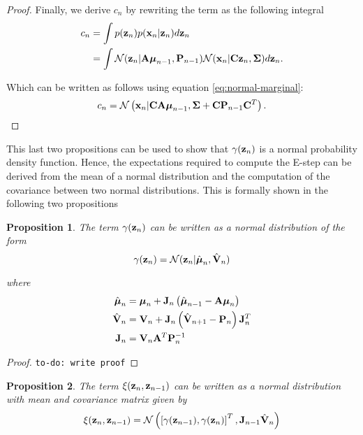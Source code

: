 \documentclass[11pt]{article}
\numberwithin{equation}{section}
\newcommand{\x}{{\bf x}}
\newcommand{\z}{{\bf z}}
\newtheorem{proposition}{Proposition}[section]
\begin{document}
\begin{proof}
	Finally, we derive $c_n$ by rewriting the term as the following integral
	\begin{align}
		c_n &= \int p(\z_n) p (\x_n \vert \z_n) d\z_n\\
			&= \int \mathcal{N}(\z_n\vert {\bf A} \boldsymbol\mu_{n-1}, {\bf P}_{n-1}) \mathcal{N}(\x_n \vert {\bf C}\z_n, \boldsymbol\Sigma) d\z_n.
	\end{align}
	
	Which can be written as follows using equation \ref{eq:normal-marginal}:
	\begin{equation}
		c_n = \mathcal{N}\left(\x_n \vert {\bf C}{\bf A}\boldsymbol\mu_{n-1}, \boldsymbol\Sigma + {\bf C}{\bf P}_{n-1}{\bf C}^T\right).
	\end{equation}	
\end{proof}


This last two propositions can be used to show that $\gamma(\z_n)$ is a normal probability density function. Hence, the expectations required to compute the E-step can be derived from the mean of a normal distribution and the computation of the covariance between two normal distributions. This is formally shown in the following two propositions


\begin{proposition}
	The term $\gamma(\z_n)$ can be written as a normal distribution of the form
	\begin{equation}
		\gamma(\z_n) = \mathcal{N}(\z_n\vert \hat{\boldsymbol\mu}_n, \hat{\bf V}_n)
	\end{equation}
	
	where
	\begin{align}
		\hat{\boldsymbol{\mu}}_n &= \boldsymbol{\mu}_n + {\bf J}_n\left(\hat{\boldsymbol \mu}_{n-1} - {\bf A}\boldsymbol\mu_n\right)\\
		\hat{\bf V}_n &= {\bf V}_n + {\bf J}_n\left(\hat{\bf V}_{n+1} - {\bf P}_n\right){\bf J}_n^T\\
		{\bf J}_n &= {\bf V}_n{\bf A}^T{\bf P}_n^{-1}
	\end{align}
\end{proposition}

\begin{proof}
	\texttt{to-do: write proof}
\end{proof}

\begin{proposition}
	The term $\xi(\z_n, \z_{n-1})$ can be written as a normal distribution with mean and covariance matrix given by
	\begin{equation}
		\xi(\z_n, \z_{n-1}) = \mathcal{N}\left(\left[\gamma(\z_{n-1}), \gamma(\z_{n})\right]^T, {\bf J}_{n-1}\hat{\bf V}_{n}\right)
	\end{equation}
\end{proposition}
\end{document}
